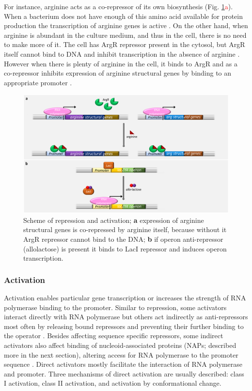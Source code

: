For instance, arginine acts as a co-repressor of its own biosynthesis (Fig. \ref{dir}\textcolor{red}{a}).
When a bacterium does not have enough of this amino acid available for protein production the transcription of arginine genes is active \cite{charlier2004biosynthesis, caldara2006arginine}.
On the other hand, when arginine is abundant in the culture medium, and thus in the cell, there is no need to make more of it.
The cell has ArgR repressor present in the cytosol, but ArgR itself cannot bind to DNA and inhibit transcription in the absence of arginine \cite{clark2005molecular, caldara2006arginine}.
However when there is plenty of arginine in the cell, it binds to ArgR and as a co-repressor inhibits expression of arginine structural genes by binding to an appropriate promoter \cite{charlier1992arginine, charlier2004biosynthesis, clark2005molecular}.

\begin{figure}[ht]
  \centering
  \includegraphics[scale=0.27]{text/Pictures/DirectSignaling.png}
    \caption{Scheme of repression and activation; \textbf{a} expression of arginine structural genes is co-repressed by arginine itself, because without it ArgR repressor cannot bind to the DNA; \textbf{b} if  operon anti-repressor (allolactose) is present it binds to LacI repressor and induces  operon transcription.}
    \label{dir}
\end{figure}

\subsubsection{Activation}
Activation enables particular gene transcription or increases the strength of RNA polymerase binding to the promoter.
Similar to repression, some activators interact directly with RNA polymerase but others act indirectly as anti-repressors most often by releasing bound repressors and preventing their further binding to the operator \cite{frederix2011co}.
Besides affecting sequence specific repressors, some indirect activators also affect binding of nucleoid-associated proteins (NAPs; described more in the next section), altering access for RNA polymerase to the promoter sequence \cite{santana2001transcriptional}.
Direct activators mostly facilitate the interaction of RNA polymerase and promoter.
Three mechanisms of direct activation are usually described: class I activation, class II activation, and activation by conformational change.


